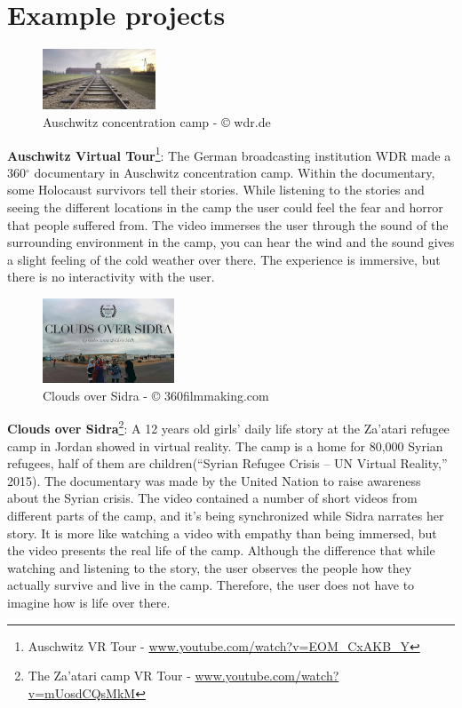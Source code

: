 \section{Example projects}

\begin{figure}
    \centering
    \includegraphics[width=0.30\textwidth]{images/Auschwitz2.png}
    \caption{Auschwitz concentration camp - © wdr.de}
    \label{fig:awsch}
\end{figure}
\textbf{Auschwitz Virtual Tour}\footnote{Auschwitz VR Tour - \url{www.youtube.com/watch?v=EOM_CxAKB_Y}}: The German broadcasting institution WDR made a 360$^{\circ}$
documentary in Auschwitz concentration camp. Within the documentary, some Holocaust
survivors tell their stories. While listening to the stories and seeing the different locations in
the camp the user could feel the fear and horror that people suffered from. The video
immerses the user through the sound of the surrounding environment in the camp, you can
hear the wind and the sound gives a slight feeling of the cold weather over there. The
experience is immersive, but there is no interactivity with the user.

\begin{figure}
    \centering
    \includegraphics[width=0.35\textwidth]{images/clouds.png}
    \caption{Clouds over Sidra - © 360filmmaking.com}
    \label{fig:sidra}
\end{figure}
\textbf{Clouds over Sidra}\footnote{The Za’atari camp VR Tour - \url{www.youtube.com/watch?v=mUosdCQsMkM}}: A 12 years old girls’ daily life story at the Za’atari refugee camp in Jordan
showed in virtual reality. The camp is a home for 80,000 Syrian refugees, half of them are
children(“Syrian Refugee Crisis – UN Virtual Reality,” 2015). The documentary was made by
the United Nation to raise awareness about the Syrian crisis. The video contained a number
of short videos from different parts of the camp, and it’s being synchronized while Sidra
narrates her story. It is more like watching a video with empathy than being immersed, but
the video presents the real life of the camp. Although the difference that while watching and
listening to the story, the user observes the people how they actually survive and live in the
camp. Therefore, the user does not have to imagine how is life over there.


